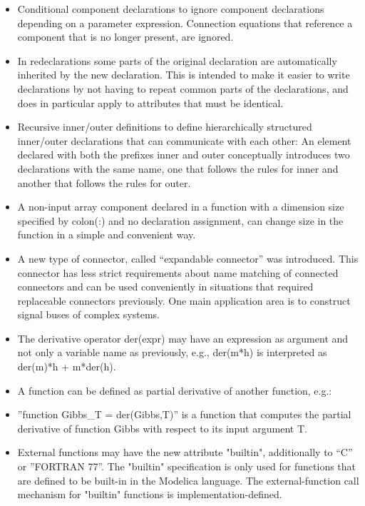 \documentclass[10pt,a4paper]{report}
\begin{document}
\begin{itemize}
\item
  Conditional component declarations to ignore component declarations
  depending on a parameter expression. Connection equations that
  reference a component that is no longer present, are ignored.
\item
  In redeclarations some parts of the original declaration are
  automatically inherited by the new declaration. This is intended to
  make it easier to write declarations by not having to repeat common
  parts of the declarations, and does in particular apply to attributes
  that must be identical.
\item
  Recursive inner/outer definitions to define hierarchically structured
  inner/outer declarations that can communicate with each other: An
  element declared with both the prefixes inner and outer conceptually
  introduces two declarations with the same name, one that follows the
  rules for inner and another that follows the rules for outer.
\item
  A non-input array component declared in a function with a dimension
  size specified by colon(:) and no declaration assignment, can change
  size in the function in a simple and convenient way.
\item
  A new type of connector, called ``expandable connector'' was
  introduced. This connector has less strict requirements about name
  matching of connected connectors and can be used conveniently in
  situations that required replaceable connectors previously. One main
  application area is to construct signal buses of complex systems.
\item
  The derivative operator der(expr) may have an expression as argument
  and not only a variable name as previously, e.g., der(m*h) is
  interpreted as der(m)*h + m*der(h).
\item
  A function can be defined as partial derivative of another function,
  e.g.:
\item
  ''function Gibbs\_T = der(Gibbs,T)'' is a function that computes the
  partial derivative of function Gibbs with respect to its input
  argument T.
\item
  External functions may have the new attribute "builtin", additionally
  to ``C'' or ''FORTRAN 77''. The "builtin" specification is only used
  for functions that are defined to be built-in in the Modelica
  language. The external-function call mechanism for "builtin" functions
  is implementation-defined.
\end{itemize}
\end{document}
